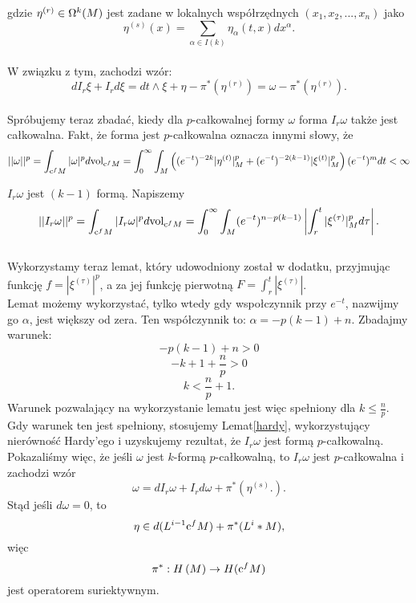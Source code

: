 \documentclass[licencjacka]{pracamgr}
\theoremstyle{definition}
\theoremstyle{definition}
\theoremstyle{plain}
\theoremstyle{plain}
\theoremstyle{plain}
\def\cfm{\ensuremath\mathrm{c}^fM}
\def\M{\ensuremath M}
\begin{document}
gdzie $\eta^{(r)} \in \Omega^k (\M)$ jest zadane w lokalnych współrzędnych
$(x_1, x_2, ..., x_n)$ jako 
\[
    \eta^{(s)}(x) = \sum_{\alpha \in I(k)} \eta_\alpha(t, x) dx^\alpha.
\] \\

W związku z tym, zachodzi wzór:
\[
    d I_r \xi + I_r d \xi = dt \wedge \xi + \eta - \pi^\ast \left( \eta^{(r)} \right) =
      \omega - \pi^\ast(\eta^{(r)})
.
\] \\

Spróbujemy teraz zbadać, kiedy dla $p$-całkowalnej formy $\omega$ forma $I_r \omega$
także jest całkowalna. Fakt, że forma jest  $p$-całkowalna oznacza innymi słowy, że
\[
    || \omega ||^p = \int_{\cfm} |\omega|^p d \text{vol}_{\cfm} =
    \int_0^\infty \int_{\M} \left(
        (e^{-t})^{-2k} | \eta^{(t)}|^p_{\M} + 
        (e^{-t})^{-2(k-1)} | \xi^{(t)}|^p_{\M} 
    \right)
    (e^{-t})^{m} dt < \infty
\]

$I_r \omega$ jest $(k-1)$ formą. Napiszemy
\[
    ||I_r \omega ||^p = 
    \int_{\cfm} |I_r \omega|^p  d\text{vol}_{\cfm} =
    \int_0^\infty \int_{\M} 
        (e^{-t})^{n-p(k-1)}
      \left| \int_r^t |\xi^{(\tau)} |^p_{\M} d\tau \right|.
\] \\

Wykorzystamy teraz lemat, który udowodniony został w dodatku, przyjmując
funkcję $f = |\xi^{(\tau)} |^p$, a za jej funkcję pierwotną 
$F = \int_r^t |\xi^{(\tau)}| $. \\

Lemat możemy wykorzystać, tylko wtedy gdy 
wspołczynnik przy $e^{-t}$, nazwijmy go $\alpha$, jest większy od zera. Ten współczynnik to:
$\alpha = -p(k-1) + n$. Zbadajmy warunek:
\[
    -p(k-1) + n > 0
\]
\[
    -k + 1 + \frac{n}{p} > 0
\]
\[
    k < \frac{n}{p} + 1.
\]
Warunek pozwalający na wykorzystanie lematu jest więc spełniony dla $k \leq
\frac{n}{p}$. \\

Gdy warunek ten jest spełniony, stosujemy Lemat\ref{hardy},
wykorzystujący nierówność Hardy'ego i uzyskujemy rezultat, że $I_r \omega$ jest formą $p$-całkowalną. \\

Pokazaliśmy więc, że jeśli $\omega$ jest $k$-formą $p$-całkowalną, to  $I_r \omega$ jest
$p$-całkowalna i zachodzi wzór
\[
    \omega = dI_r \omega + I_r d \omega + \pi^\ast 
    \left(
        \eta^{(s)}.
    \right).
\]
Stąd jeśli $d \omega = 0$, to 
\[
    \eta \in d(L^{i-1} \cfm) + \pi^\ast (L^i*\M),
\]
więc 
\[
    \pi^\ast: H \left( \M \right) \rightarrow H ( \cfm )
\]
jest operatorem suriektywnym. \\
\end{document}
